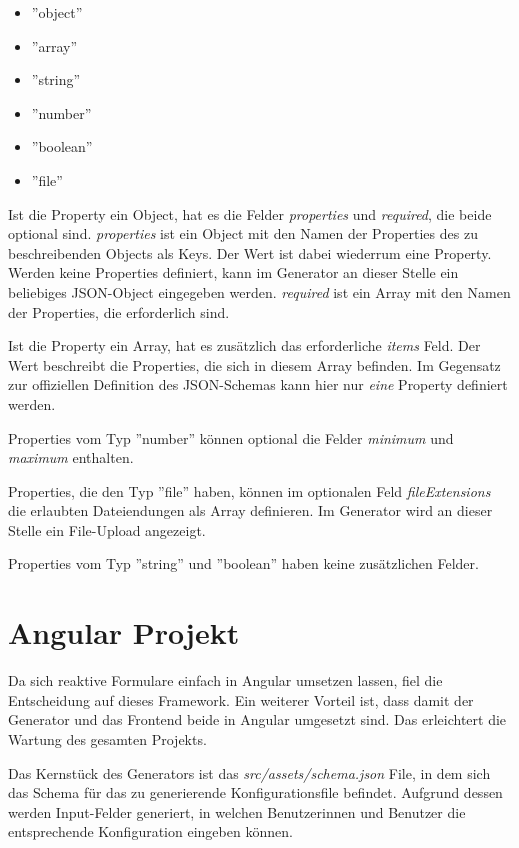 \begin{itemize}
    \item ''object''
    \item ''array''
    \item ''string''
    \item ''number''
    \item ''boolean''
    \item ''file''
\end{itemize}

Ist die Property ein Object, hat es die Felder \textit{properties} und \textit{required}, die beide optional sind.
\textit{properties} ist ein Object mit den Namen der Properties des zu beschreibenden Objects als Keys.
Der Wert ist dabei wiederrum eine Property.
Werden keine Properties definiert, kann im Generator an dieser Stelle ein beliebiges JSON-Object eingegeben werden.
\textit{required} ist ein Array mit den Namen der Properties, die erforderlich sind.

Ist die Property ein Array, hat es zusätzlich das erforderliche \textit{items} Feld.
Der Wert beschreibt die Properties, die sich in diesem Array befinden.
Im Gegensatz zur offiziellen Definition des JSON-Schemas kann hier nur \textit{eine} Property definiert werden.

Properties vom Typ ''number'' können optional die Felder \textit{minimum} und \textit{maximum} enthalten.

Properties, die den Typ ''file'' haben, können im optionalen Feld \textit{fileExtensions} die erlaubten
Dateiendungen als Array definieren.
Im Generator wird an dieser Stelle ein File-Upload angezeigt.

Properties vom Typ ''string'' und ''boolean'' haben keine zusätzlichen Felder.


\section{Angular Projekt}
Da sich reaktive Formulare einfach in Angular umsetzen lassen, fiel die Entscheidung auf dieses Framework.
Ein weiterer Vorteil ist, dass damit der Generator und das Frontend beide in Angular umgesetzt sind.
Das erleichtert die Wartung des gesamten Projekts.

Das Kernstück des Generators ist das \textit{src/assets/schema.json} File, in dem sich das Schema für das zu
generierende Konfigurationsfile befindet.
Aufgrund dessen werden Input-Felder generiert, in welchen Benutzerinnen und Benutzer die entsprechende
Konfiguration eingeben können.

